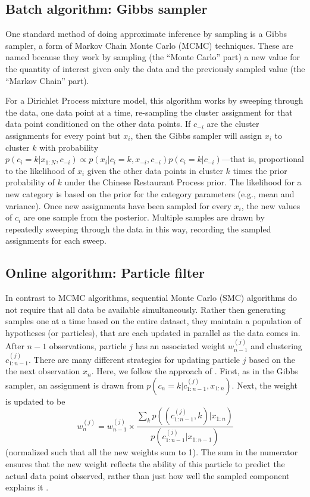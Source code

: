 \documentclass[10pt,letterpaper]{article}
\begin{document}
\hypertarget{batch-algorithm-gibbs-sampler}{%
\subsection{Batch algorithm: Gibbs
sampler}\label{batch-algorithm-gibbs-sampler}}

One standard method of doing approximate inference by sampling is a
Gibbs sampler, a form of Markov Chain Monte Carlo (MCMC) techniques.
These are named because they work by sampling (the \enquote{Monte Carlo}
part) a new value for the quantity of interest given only the data and
the previously sampled value (the \enquote{Markov Chain} part).

For a Dirichlet Process mixture model, this algorithm works by sweeping
through the data, one data point at a time, re-sampling the cluster
assignment for that data point conditioned on the other data points. If
\(c_{-i}\) are the cluster assignments for every point but \(x_i\), then
the Gibbs sampler will assign \(x_i\) to cluster \(k\) with probability
\(p(c_i=k | x_{1:N}, c_{-i}) \propto p(x_i | c_i=k, x_{-i}, c_{-i}) p(c_i=k | c_{-i})\)---that
is, proportional to the likelihood of \(x_i\) given the other data
points in cluster \(k\) times the prior probability of \(k\) under the
Chinese Restaurant Process prior. The likelihood for a new category is
based on the prior for the category parameters (e.g., mean and
variance). Once new assignments have been sampled for every \(x_i\), the
new values of \(c_i\) are one sample from the posterior. Multiple
samples are drawn by repeatedly sweeping through the data in this way,
recording the sampled assignments for each sweep.

\hypertarget{online-algorithm-particle-filter}{%
\subsection{Online algorithm: Particle
filter}\label{online-algorithm-particle-filter}}

In contrast to MCMC algorithms, sequential Monte Carlo (SMC) algorithms
do not require that all data be available simultaneously. Rather then
generating samples one at a time based on the entire dataset, they
maintain a population of hypotheses (or particles), that are each
updated in parallel as the data comes in. After \(n-1\) observations,
particle \(j\) has an associated weight \(w^{(j)}_{n-1}\) and clustering
\(c_{1:n-1}^{(j)}\). There are many different strategies for updating
particle \(j\) based on the the next observation \(x_n\). Here, we
follow the approach of \textcites{Chen2000}[as described
in][]{Fearnhead2004}. First, as in the Gibbs sampler, an assignment is
drawn from \(p(c_n=k | c^{(j)}_{1:n-1}, x_{1:n})\). Next, the weight is
updated to be \[
    w_{n}^{(j)} = w_{n-1}^{(j)} \times
        \frac{\sum_k p((c_{1:n-1}^{(j)},k) | x_{1:n})}
             {p(c_{1:n-1}^{(j)} | x_{1:n-1})}
\] (normalized such that all the new weights sum to 1). The sum in the
numerator ensures that the new weight reflects the ability of this
particle to predict the actual data point observed, rather than just how
well the sampled component explains it \autocites[see][]{Chen2000}[ for
further discussion]{Fearnhead2004}.
\end{document}
